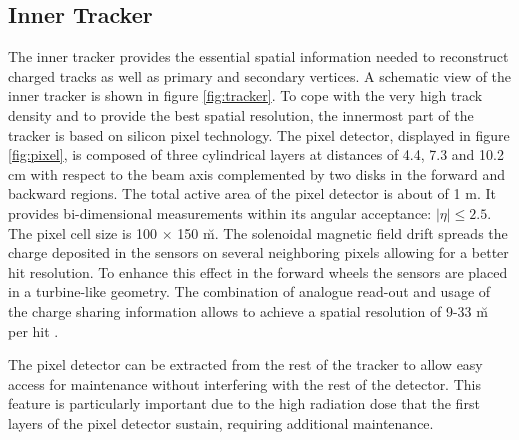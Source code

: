 \subsection{Inner Tracker}
\label{sec:inner_tracker}

The inner tracker provides the essential spatial information needed to reconstruct charged tracks as well as primary and secondary vertices. A schematic view of the inner tracker is shown in figure \ref{fig:tracker}. To cope with the very high track density and to provide the best spatial resolution, the innermost part of the tracker is based on silicon pixel technology. The pixel detector, displayed in figure \ref{fig:pixel}, is composed of three cylindrical layers at distances of 4.4, 7.3 and 10.2 cm with respect to the beam axis complemented by two disks  in the forward and backward regions. The total active area of the pixel detector is about of 1 m\sq.  It provides bi-dimensional measurements within its angular acceptance: $|\eta| \leq 2.5$. The pixel cell size is 100 $\times$ 150 \u m\sq. 
The solenoidal magnetic field drift spreads the charge deposited in the sensors on several neighboring pixels allowing for a better hit resolution.
To enhance this effect in the forward wheels the sensors are placed in a turbine-like geometry. The combination of analogue read-out and usage of the charge sharing information allows to achieve a spatial resolution of 9-33 \u m per hit \cite{trackingpaper}. 

The pixel detector can be extracted from the rest of the tracker to allow easy access for maintenance without interfering with the rest of the detector. This feature is particularly important due to the high radiation dose that the first layers of the pixel detector sustain, requiring additional maintenance.

